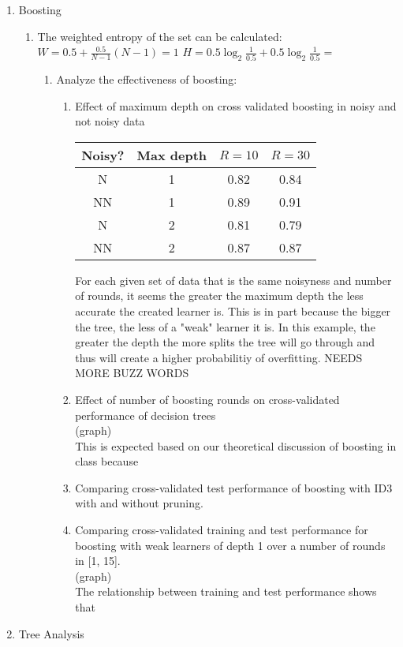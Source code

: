 \documentclass[11pt]{article}
\begin{document}
\begin{enumerate}
\item Boosting
\begin{enumerate}
	\item The weighted entropy of the set can be calculated:\\
	$W=0.5 + \frac{0.5}{N-1}(N-1) = 1$
	$H = 0.5\log_2 \frac{1}{0.5} + 0.5\log_2 \frac{1}{0.5} =$ 
	\begin{enumerate} 
	\item Analyze the effectiveness of boosting:
		\begin{enumerate}
			\item Effect of maximum depth on cross validated boosting in noisy and not noisy data
				\begin{tabular}{|c|c|c|c|}
				\hline
				Noisy? & Max depth & $R = 10$ & $R = 30$\\ \hline
				N & 1 & 0.82 & 0.84\\ \hline
				NN & 1 & 0.89 & 0.91\\ \hline
				N & 2 & 0.81 & 0.79 \\ \hline
				NN & 2 & 0.87 & 0.87\\
				\hline
				\end{tabular}
			For each given set of data that is the same noisyness and number of rounds, it seems the greater the maximum depth the less accurate the created learner is. This is in part because the bigger the tree, the less of a "weak" learner it is. In this example, the greater the depth the more splits the tree will go through and thus will create a higher probabilitiy of overfitting. NEEDS MORE BUZZ WORDS
			\item Effect of number of boosting rounds on cross-validated performance of decision trees\\
			(graph)\\
			This is expected based on our theoretical discussion of boosting in class because
			\item Comparing cross-validated test performance of boosting with ID3 with and without pruning.
			\item Comparing cross-validated training and test performance for boosting with weak learners of depth 1 over a number of rounds in [1, 15].\\
			(graph)\\
			The relationship between training and test performance shows that
		\end{enumerate}
	\end{enumerate}
\end{enumerate}

\item Tree Analysis

\end{enumerate}
\end{document}
